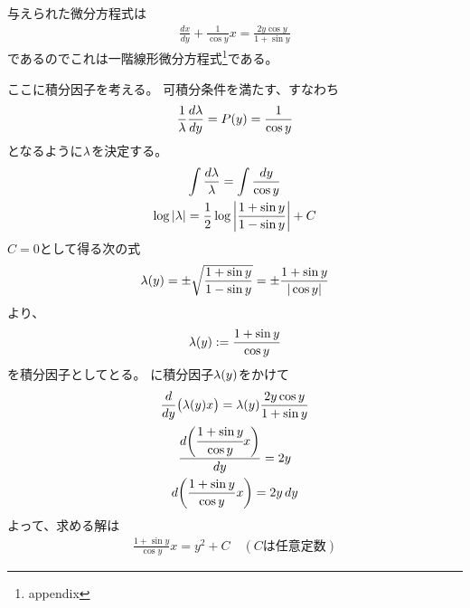 
\begin{ans*}
  与えられた微分方程式は
  \begin{gather}
    \frac{dx}{dy} + \frac{1}{\cos y} x = \frac{2y\cos y}{1+\sin y} \label{eq:2020_autumn_ODE}
  \end{gather}
  であるのでこれは一階線形微分方程式\footnote{appendix}である。

  ここに積分因子を考える。
  可積分条件を満たす、すなわち
  \begin{gather}
    \frac{1}{{\lambda}}\frac{d{\lambda}}{dy} = P(y) = \frac{1}{\cos y}
  \end{gather}
  となるように${\lambda}$を決定する。
  \begin{gather}
    \int \frac{d{\lambda}}{{\lambda}} = \int\frac{dy}{\cos y} \\
    \log |{\lambda}| = \frac{1}{2}\log\left| \frac{1+\sin y}{1-\sin y} \right| + C
  \end{gather}
  $C=0$として得る次の式
  \begin{gather}
    {\lambda}(y) = \pm\sqrt{\frac{1+\sin y}{1-\sin y}} = \pm\frac{1+\sin y}{|\cos y|}
  \end{gather}
  より、
  \begin{gather}
    {\lambda}(y) := \frac{1+\sin y}{\cos y}
  \end{gather}
  を積分因子としてとる。
  に積分因子${\lambda}(y)$をかけて
  \begin{gather}
    \frac{d}{dy}\bigl({\lambda}(y)x\bigr) = {\lambda}(y)\frac{2y\cos y}{1+\sin y} \\
    \frac{d\biggl(\cfrac{1+\sin y}{\cos y}x\biggr)}{dy} = 2y \\
    d\biggl(\frac{1+\sin y}{\cos y}x\biggr) = 2y\,dy
  \end{gather}
  よって、求める解は
  \begin{gather}
    \frac{1+\sin y}{\cos y}x = y^2 + C \quad(\text{$C$は任意定数})
  \end{gather}
\end{ans*}

